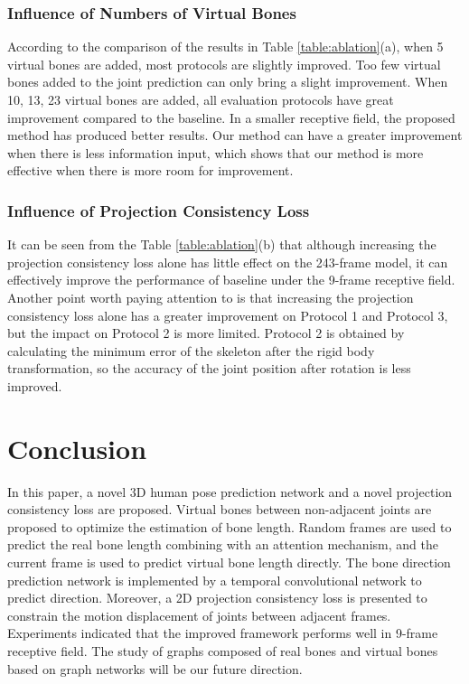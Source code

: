 \documentclass[journal]{IEEEtran}
\begin{document}
\subsubsection{Influence of Numbers of Virtual Bones} According to the comparison of the results in Table \ref{table:ablation}(a), when 5 virtual bones are added, most protocols are slightly improved. Too few virtual bones added to the joint prediction can only bring a slight improvement. When 10, 13, 23 virtual bones are added, all evaluation protocols have great improvement compared to the baseline. In a smaller receptive field,  the proposed method has produced better results. Our method can have a greater improvement when there is less information input, which shows that our method is more effective when there is more room for improvement.

\subsubsection{Influence of Projection Consistency Loss} It can be seen from the Table \ref{table:ablation}(b) that although increasing the projection consistency loss alone has little effect on the 243-frame model, it can effectively improve the performance of baseline under the 9-frame receptive field.
Another point worth paying attention to is that increasing the projection consistency loss alone has a greater improvement on Protocol 1 and Protocol 3, but the impact on Protocol 2 is more limited. 
Protocol 2 is obtained by calculating the minimum error of the skeleton after the rigid body transformation, so the accuracy of the joint position after rotation is less improved.
\section{Conclusion}
\vspace{-0pt}
In this paper, a novel 3D human pose prediction network and a novel projection consistency loss are proposed. Virtual bones between non-adjacent joints are proposed to optimize the estimation of bone length. Random frames are used to predict the real bone length combining with an attention mechanism, and the current frame is used to predict virtual bone length directly. The bone direction prediction network is implemented by a temporal convolutional network to predict direction. Moreover, a 2D projection consistency loss is presented to constrain the motion displacement of joints between adjacent frames. Experiments indicated that the improved framework performs well in 9-frame receptive field. The study of graphs composed of real bones and virtual bones based on graph networks will be our future direction.
\end{document}
